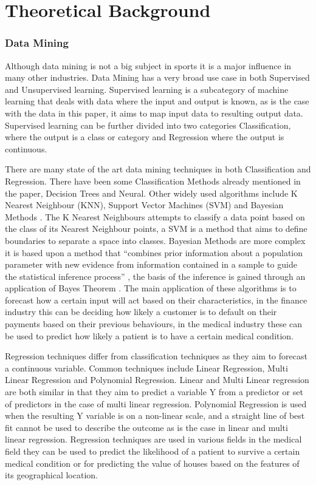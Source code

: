 \documentclass{imc-inf}
\begin{document}
	\chapter{Theoretical Background}\label{chap:background}
	\subsection{Data Mining}
	Although data mining is not a big subject in sports it is a major influence in many other industries. Data Mining has a very broad use case in both Supervised and Unsupervised learning. Supervised learning is a subcategory of machine learning that deals with data where the input and output is known, as is the case with the data in this paper, it aims to map input data to resulting output data. Supervised learning can be further divided into two categories Classification, where the output is a class or category and Regression where the output is continuous. 
	
	There are many state of the art data mining techniques in both Classification and Regression. There have been some Classification Methods already mentioned in the paper, Decision Trees and Neural. Other widely used algorithms include K Nearest Neighbour (KNN), Support Vector Machines (SVM) and Bayesian Methods \cite{SOTA}. The K Nearest Neighbours attempts to classify a data point based on the class of its Nearest Neighbour points, a SVM is a method that aims to define boundaries to separate a space into classes. Bayesian Methods are more complex it is based upon a method that “combines prior information about a population parameter with new evidence from information contained in a sample to guide the statistical inference process” \cite{website:Britannica}, the basis of the inference is gained through an application of Bayes Theorem \cite{website:Britannica}. The main application of these algorithms is to forecast how a certain input will act based on their characteristics, in the finance industry this can be deciding how likely a customer is to default on their payments based on their previous behaviours, in the medical industry these can be used to predict how likely a patient is to have a certain medical condition.
	
	Regression techniques differ from classification techniques as they aim to forecast a continuous variable. Common techniques include Linear Regression, Multi Linear Regression and Polynomial Regression. Linear and Multi Linear regression are both similar in that they aim to predict a variable Y from a predictor or set of predictors in the case of multi linear regression. Polynomial Regression is used when the resulting Y variable is on a non-linear scale, and a straight line of best fit cannot be used to describe the outcome as is the case in linear and multi linear regression. Regression techniques are used in various fields in the medical field they can be used to predict the likelihood of a patient to survive a certain medical condition \cite{SOTA} or for predicting the value of houses based on the features of its geographical location.
	
\end{document}

